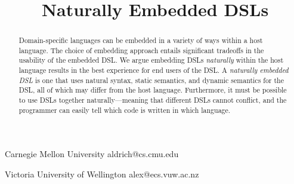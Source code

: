 \documentclass{sigplanconf}
\begin{document}
\setlength{\pdfpageheight}{\paperheight}
\setlength{\pdfpagewidth}{\paperwidth}




\title{Naturally Embedded DSLs}

           {Carnegie Mellon University}
           {aldrich@cs.cmu.edu}

		   
		   
           {Victoria University of Wellington}
           {alex@ecs.vuw.ac.nz}
		   
\maketitle

\begin{abstract}
Domain-specific languages can be embedded in a variety of ways within a
host language.  The choice of embedding approach entails significant
tradeoffs in the usability of the embedded DSL.  We argue embedding DSLs
\textit{naturally} within the host language results in the best
experience for end users of the DSL.  A \textit{naturally embedded DSL}
is one that uses natural syntax, static semantics, and dynamic semantics
for the DSL, all of which may differ from the host language.
Furthermore, it must be possible to use DSLs together
naturally---meaning that different DSLs cannot conflict, and the
programmer can easily tell which code is written in which language.
\end{abstract}


%
\end{document}
